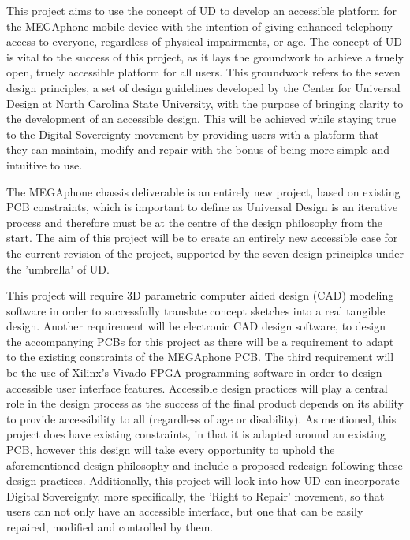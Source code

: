 This project aims to use the concept of UD to develop an accessible platform for the MEGAphone mobile device with the intention of giving enhanced telephony access to everyone, regardless of physical impairments, or age.
The concept of UD is vital to the success of this project, as it lays the groundwork to achieve a truely open, truely accessible platform for all users. 
This groundwork refers to the seven design principles, a set of design guidelines developed by the Center for Universal Design at North Carolina State University\cite{sevenprinciples}, with the purpose of bringing clarity to the development of an accessible design.
This will be achieved while staying true to the Digital Sovereignty movement by providing users with a platform that they can maintain, modify and repair with the bonus of being more simple and intuitive to use.

The MEGAphone chassis deliverable is an entirely new project, based on existing PCB constraints, which is important to define as Universal Design is an iterative process and therefore must be at the centre of the design philosophy from the start\cite{incldesign}.
The aim of this project will be to create an entirely new accessible case for the current revision of the project, supported by the seven design principles under the 'umbrella' of UD.

This project will require 3D parametric computer aided design (CAD) modeling software in order to successfully translate concept sketches into a real tangible design.
Another requirement will be electronic CAD design software, to design the accompanying PCBs for this project as there will be a requirement to adapt to the existing constraints of the MEGAphone PCB.
The third requirement will be the use of Xilinx's Vivado FPGA programming software in order to design accessible user interface features.
Accessible design practices will play a central role in the design process as the success of the final product depends on its ability to provide accessibility to all (regardless of age or disability). 
As mentioned, this project does have existing constraints, in that it is adapted around an existing PCB, however this design will take every opportunity to uphold the aforementioned design philosophy and include a proposed redesign following these design practices.
Additionally, this project will look into how UD can incorporate Digital Sovereignty, more specifically, the 'Right to Repair' movement, so that users can not only have an accessible interface, but one that can be easily repaired, modified and controlled by them.

